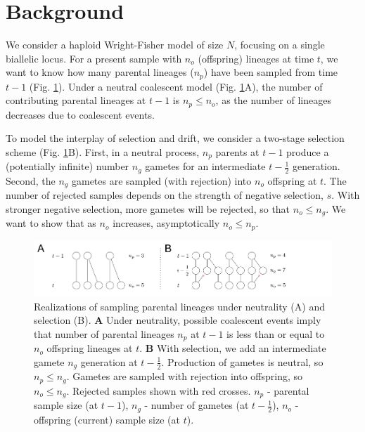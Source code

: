 \documentclass[review]{elsarticle}
\begin{document}

\section{Background}
\label{sec:background}

We consider a haploid Wright-Fisher model of size $N$, focusing on a single biallelic locus. For a
present sample with $n_o$ (offspring) lineages at time $t$, we want to know how many parental
lineages ($n_p$) have been sampled from time $t-1$ (Fig. \ref{fig:schematic}). Under a neutral
coalescent model (Fig. \ref{fig:schematic}A), the number of contributing parental lineages at $t-1$
is $n_p \le n_o$, as the number of lineages decreases due to coalescent events.

To model the interplay of selection and drift, we consider a two-stage selection scheme (Fig.
\ref{fig:schematic}B). First, in a neutral process, $n_p$ parents at $t-1$ produce a (potentially
infinite) number $n_g$ gametes for an intermediate $t-\frac{1}{2}$ generation. Second, the $n_g$
gametes are sampled (with rejection) into $n_o$ offspring at $t$. The number of rejected samples
depends on the strength of negative selection, $s$. With stronger negative selection, more gametes
will be rejected, so that $n_o \le n_g$. We want to show that as $n_o$ increases, asymptotically
$n_o \le n_p$.

\begin{figure}[ht]
  \centering
  \includegraphics[width=1.0\textwidth]{fig/schematic.pdf}
  \caption{\label{fig:schematic} Realizations of sampling parental lineages under neutrality (A) and
    selection (B). \textbf{A} Under neutrality, possible coalescent events imply that number of
    parental lineages $n_p$ at $t-1$ is less than or equal to $n_o$ offspring lineages at $t$.
    \textbf{B} With selection, we add an intermediate gamete $n_g$ generation at $t-\frac{1}{2}$.
    Production of gametes is neutral, so $n_p\le n_g$. Gametes are sampled with rejection into
    offspring, so $n_o \le n_g$. Rejected samples shown with red crosses. $n_p$ - parental sample
    size (at $t-1$), $n_g$ - number of gametes (at $t-\frac{1}{2}$), $n_o$ - offspring (current)
    sample size (at $t$).}
\end{figure}
\end{document}
